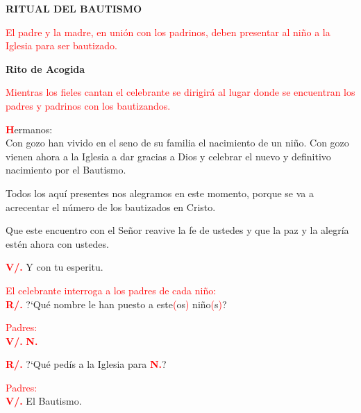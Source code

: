 \documentclass[12pt, letterpaper, spanish]{article}
\begin{document}
  \begin{center}
    \Huge {\bfseries RITUAL DEL BAUTISMO}
  \end{center}

  \large {\textcolor{red}{El padre y la madre, en uni\'on con los padrinos, deben presentar al ni\~no a la Iglesia para ser bautizado.}}

  \begin{center}
    \Huge {\bfseries Rito de Acogida}
  \end{center}

  \large {\textcolor{red}{Mientras los fieles cantan el celebrante se dirigir\'a al lugar donde se encuentran los padres y padrinos con los bautizandos.}}

  \lettrine[lines=2]{\bfseries \textcolor{red}{H}}{}\Large {ermanos:}\\
  \Large{Con gozo han vivido en el seno de su familia el nacimiento de un ni\~no. Con gozo vienen ahora a la Iglesia a dar gracias a Dios y celebrar el nuevo y definitivo nacimiento por el Bautismo.}

  \noindent
  \Large {Todos los aqu\'i presentes nos alegramos en este momento, porque se va a acrecentar el n\'umero de los bautizados en Cristo.}

  \noindent
  \Large {Que este encuentro con el Se\~nor reavive la fe de ustedes y que la paz y la alegr\'ia est\'en ahora con ustedes.}

  \noindent
  \Large{{\bfseries \textcolor{red}{V/.}} \hspace{1cm} Y con tu esperitu.}

  \large {\textcolor{red}{El celebrante interroga a los padres de cada ni\~no:}}\\
  \Large {\bfseries \textcolor{red}{R/.}} \hspace{1cm} ?`Qu\'e nombre le han puesto a este\textcolor{red}{(}os\textcolor{red}{)} ni\~no\textcolor{red}{(}s\textcolor{red}{)}?

  \large {\textcolor{red}{Padres:}}\\
  {\bfseries \textcolor{red}{V/.}} \hspace{1cm} \Large {\bfseries \textcolor{red}{N.}}

  \noindent
  \Large {{\bfseries \textcolor{red}{R/.}} \hspace{1cm} ?`Qu\'e ped\'is a la Iglesia para \bfseries \textcolor{red}{N.}}?

  \large {\textcolor{red}{Padres:}}\\
  \Large {\bfseries \textcolor{red}{V/.}} \hspace{1cm} El Bautismo.
\end{document}
